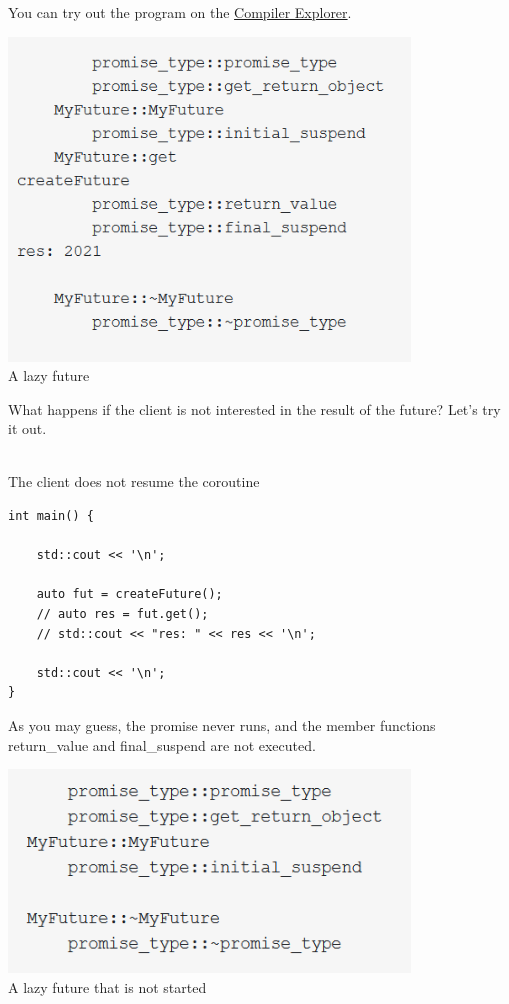 You can try out the program on the \href{https://godbolt.org/z/EejWcj}{Compiler Explorer}.

\begin{center}
\includegraphics[width=0.8\textwidth]{content/3/chapter7/images/9.png}\\
A lazy future
\end{center}

What happens if the client is not interested in the result of the future? Let’s try it out.

\hspace*{\fill} \\ %
\noindent
The client does not resume the coroutine
\begin{lstlisting}[style=styleCXX]
int main() {
	
	std::cout << '\n';
	
	auto fut = createFuture();
	// auto res = fut.get();
	// std::cout << "res: " << res << '\n';
	
	std::cout << '\n';
}
\end{lstlisting}

As you may guess, the promise never runs, and the member functions return\_value and final\_suspend are not executed.

\begin{center}
\includegraphics[width=0.8\textwidth]{content/3/chapter7/images/10.png}\\
A lazy future that is not started
\end{center}

